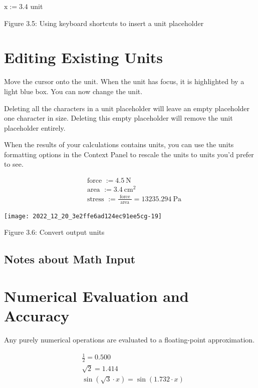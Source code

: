 $\mathrm{x}:=3.4$ unit

Figure 3.5: Using keyboard shortcuts to insert a unit placeholder

\section{Editing Existing Units}
Move the cursor onto the unit. When the unit has focus, it is highlighted by a light blue box. You can now change the unit.

Deleting all the characters in a unit placeholder will leave an empty placeholder one character in size. Deleting this empty placeholder will remove the unit placeholder entirely.

When the results of your calculations contains units, you can use the units formatting options in the Context Panel to rescale the units to units you'd prefer to see.

\begin{equation*}
\begin{aligned}
& \text { force }:=4.5 \mathrm{~N} \\
& \text { area }:=3.4 \mathrm{~cm}^{2} \\
& \text { stress }:=\frac{\text { force }}{\text { area }}=13235.294 \mathrm{~Pa}
\end{aligned}
\end{equation*}

\begin{center}
\texttt{[image: 2022\_12\_20\_3e2ffe6ad124ec91ee5cg-19]}
\end{center}

Figure 3.6: Convert output units

\subsection{Notes about Math Input}
\section{Numerical Evaluation and Accuracy}
Any purely numerical operations are evaluated to a floating-point approximation.

\begin{equation*}
\begin{aligned}
& \frac{1}{2}=0.500 \\
& \sqrt{2}=1.414 \\
& \sin (\sqrt{3} \cdot x)=\sin (1.732 \cdot x)
\end{aligned}
\end{equation*}

